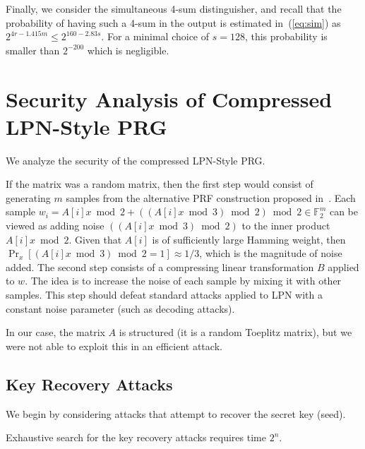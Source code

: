 \documentclass[orivec,envcountsect]{llncs}
\begin{document}


Finally, we consider the simultaneous 4-sum distinguisher,
and recall that the probability of having such a 4-sum in the output is estimated
in~(\ref{eq:sim}) as $2^{4r - 1.415 m} \leq 2^{160 - 2.83s}$.
For a minimal choice of $s = 128$, this probability is smaller than $2^{-200}$
which is negligible.



\section{Security Analysis of Compressed LPN-Style PRG}

We analyze the security of the compressed LPN-Style PRG.

If the matrix was a random matrix, then
the first step would consist of generating $m$ samples from the alternative PRF construction proposed
in~\cite{BonehIPSW18}. Each sample
$w_i = A[i] x \bmod 2 + ((A[i] x \bmod 3) \bmod 2) \bmod 2 \in \mathbb{F}_2^m$
can be viewed as adding noise $((A[i] x \bmod 3) \bmod 2)$ to the inner product $A[i] x \bmod 2$.
Given that $A[i]$ is of sufficiently large Hamming weight, then
$\Pr_x[(A[i] x \bmod 3) \bmod 2 = 1] \approx 1/3$, which is the magnitude of noise added.
The second step consists of a compressing linear transformation $B$ applied to $w$.
The idea is to increase the noise of each sample by mixing it with other samples.
This step should defeat standard attacks applied to LPN with a constant noise parameter
(such as decoding attacks).

In our case, the matrix $A$ is structured (it is a random Toeplitz matrix),
but we were not able to exploit this in an efficient attack.



\subsection{Key Recovery Attacks}

We begin by considering attacks that attempt to recover the secret key (seed).

Exhaustive search for the key recovery attacks requires time $2^n$.
\end{document}
